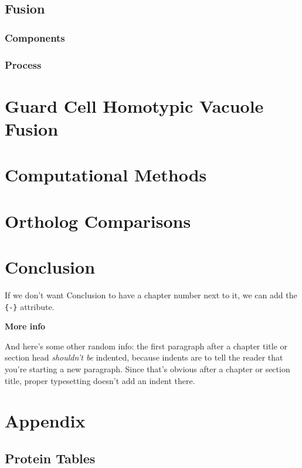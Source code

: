 \documentclass[12pt,twoside]{reedthesis}
\begin{document}
\section{Fusion}\label{fusion}

\subsection{Components}\label{components-2}

\subsection{Process}\label{process-2}

\chapter{Guard Cell Homotypic Vacuole Fusion}\label{GuardFusion}

\chapter{Computational Methods}\label{CompMethods}

\chapter{Ortholog Comparisons}\label{OrthoComp}

\chapter*{Conclusion}\label{conclusion}

If we don't want Conclusion to have a chapter number next to it, we can add the \texttt{\{-\}} attribute.

\textbf{More info}

And here's some other random info: the first paragraph after a chapter title or section head \emph{shouldn't be} indented, because indents are to tell the reader that you're starting a new paragraph. Since that's obvious after a chapter or section title, proper typesetting doesn't add an indent there.

\chapter*{Appendix}\label{appendix}

\section*{Protein Tables}\label{protein-tables}
\end{document}
